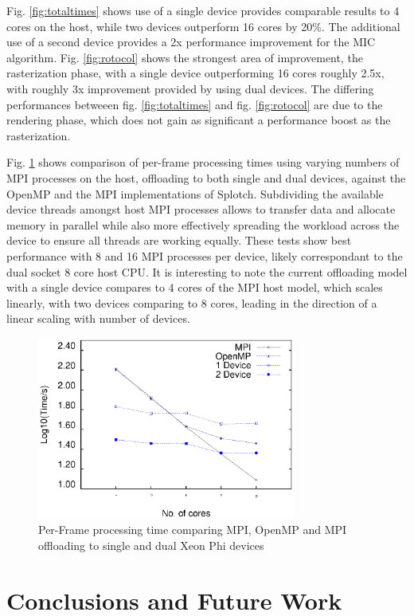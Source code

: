 \documentclass[runningheads,a4paper]{llncs}
\begin{document}
Fig. \ref{fig:totaltimes} shows use of a single device provides comparable results to 4 cores on the host, while two devices outperform 
16 cores by 20\%. The additional use of a second device provides a 2x performance improvement for the MIC algorithm. 
Fig. \ref{fig:rotocol} shows the strongest area of improvement, the rasterization phase, with a single device 
outperforming 16 cores roughly 2.5x, with roughly 3x improvement provided by using dual devices. The differing performances betweeen 
fig. \ref{fig:totaltimes} and fig. \ref{fig:rotocol} are due to the rendering phase, which does not gain as significant a 
performance boost as the rasterization. 

Fig. \ref{fig:mpitimes} shows comparison of per-frame processing times using varying numbers of MPI processes on the host, offloading to 
both single and dual devices, against the OpenMP and the MPI implementations of Splotch. Subdividing the available device threads 
amongst host MPI processes allows to transfer data and allocate memory in parallel while also more effectively spreading the 
workload across the device to ensure all threads are working equally. These tests show best performance with 8 and 16 MPI 
processes per device, likely correspondant to the dual socket 8 core host CPU. It is interesting to note the current offloading model 
with a single device compares to 4 cores of the MPI host model, which scales linearly, with two devices comparing to 8 cores, leading 
in the direction of a linear scaling with number of devices.

\begin{figure}
\centering
\includegraphics[height=6.0cm]{mpi_omp_mic}
\caption{Per-Frame processing time comparing MPI, OpenMP and MPI offloading to single and dual Xeon Phi devices}
\label{fig:mpitimes}
\end{figure}



\section{Conclusions and Future Work}
\label{sect:conclusions}
\end{document}
